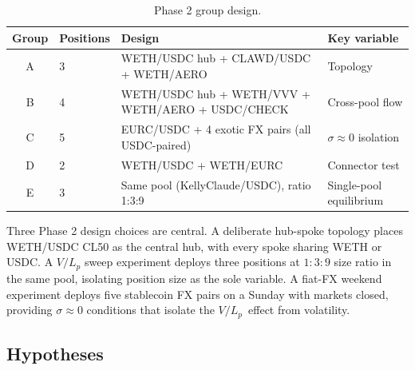 \documentclass[11pt,a4paper]{article}
\begin{document}
\begin{table}[H]
\centering
\caption{Phase 2 group design.}\label{tab:phase2-groups}
\begin{tabular}{@{}clL{8cm}l@{}}
\toprule
Group & Positions & Design & Key variable \\
\midrule
A & 3 & WETH/USDC hub + CLAWD/USDC + WETH/AERO & Topology \\
B & 4 & WETH/USDC hub + WETH/VVV + WETH/AERO + USDC/CHECK & Cross-pool flow \\
C & 5 & EURC/USDC + 4 exotic FX pairs (all USDC-paired) & $\sigma \approx 0$ isolation \\
D & 2 & WETH/USDC + WETH/EURC & Connector test \\
E & 3 & Same pool (KellyClaude/USDC), ratio 1:3:9 & Single-pool equilibrium \\
\bottomrule
\end{tabular}
\end{table}

Three Phase 2 design choices are central. A deliberate hub-spoke topology places WETH/USDC CL50 as the central hub, with every spoke sharing WETH or USDC. A $V/L_p$ sweep experiment deploys three positions at $1{:}3{:}9$ size ratio in the same pool, isolating position size as the sole variable. A fiat-FX weekend experiment deploys five stablecoin FX pairs on a Sunday with markets closed, providing $\sigma \approx 0$ conditions that isolate the $V/L_p$~effect from volatility.

\subsection{Hypotheses}\label{sec:hypotheses}
\end{document}
